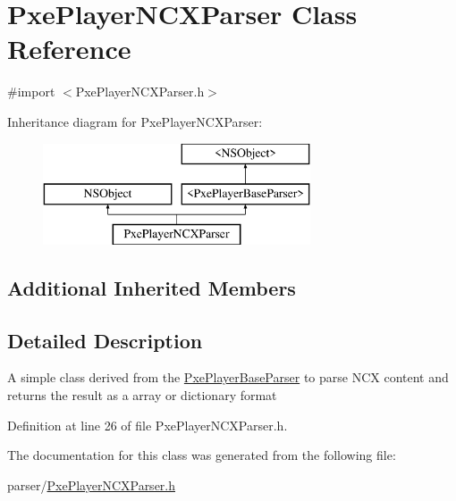 \hypertarget{interface_pxe_player_n_c_x_parser}{\section{Pxe\-Player\-N\-C\-X\-Parser Class Reference}
\label{interface_pxe_player_n_c_x_parser}
}


{\ttfamily \#import $<$Pxe\-Player\-N\-C\-X\-Parser.\-h$>$}

Inheritance diagram for Pxe\-Player\-N\-C\-X\-Parser\-:\begin{figure}[H]
\begin{center}
\leavevmode
\includegraphics[height=3.000000cm]{interface_pxe_player_n_c_x_parser}
\end{center}
\end{figure}
\subsection*{Additional Inherited Members}


\subsection{Detailed Description}
A simple class derived from the \hyperlink{protocol_pxe_player_base_parser-p}{Pxe\-Player\-Base\-Parser} to parse N\-C\-X content and returns the result as a array or dictionary format 

Definition at line 26 of file Pxe\-Player\-N\-C\-X\-Parser.\-h.



The documentation for this class was generated from the following file\-:\begin{DoxyCompactItemize}
\item 
parser/\hyperlink{_pxe_player_n_c_x_parser_8h}{Pxe\-Player\-N\-C\-X\-Parser.\-h}\end{DoxyCompactItemize}
